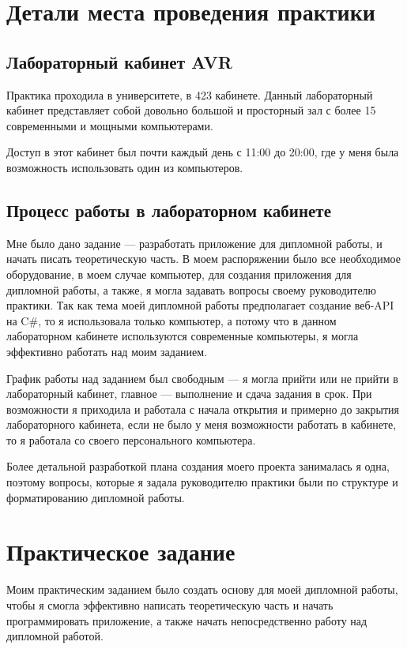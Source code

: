 \documentclass[a4paper,12pt]{report}
\begin{document}
\chapter{Детали места проведения практики}

\section{Лабораторный кабинет AVR}

Практика проходила в университете, в 423 кабинете.
Данный лабораторный кабинет представляет собой довольно большой и просторный зал с более 15 современными и мощными компьютерами.

Доступ в этот кабинет был почти каждый день с 11:00 до 20:00, где у меня была возможность использовать один из компьютеров.

\section{Процесс работы в лабораторном кабинете}

Мне было дано задание --- разработать приложение для дипломной работы, и начать писать теоретическую часть. 
В моем распоряжении было все необходимое оборудование, в моем случае компьютер, для создания приложения для дипломной работы, 
а также, я могла задавать вопросы своему руководителю практики. Так как тема моей дипломной работы предполагает создание веб-\ac{API} на C\#, 
то я использовала только компьютер, а потому что в данном лабораторном кабинете используются современные компьютеры, 
я могла эффективно работать над моим заданием. 

График работы над заданием был свободным --- я могла прийти или не прийти в лабораторный кабинет, главное --- выполнение и сдача задания в срок.
При возможности я приходила и работала с начала открытия и примерно до закрытия лабораторного кабинета, если не было у меня возможности работать в кабинете, 
то я работала со своего персонального компьютера.

Более детальной разработкой плана создания моего проекта занималась я одна, поэтому вопросы, которые я задала руководителю практики были по 
структуре и форматированию дипломной работы.

\chapter{Практическое задание}

Моим практическим заданием было создать основу для моей дипломной работы, чтобы я смогла эффективно написать теоретическую часть и начать 
программировать приложение, а также начать непосредственно работу над дипломной работой.
\end{document}
